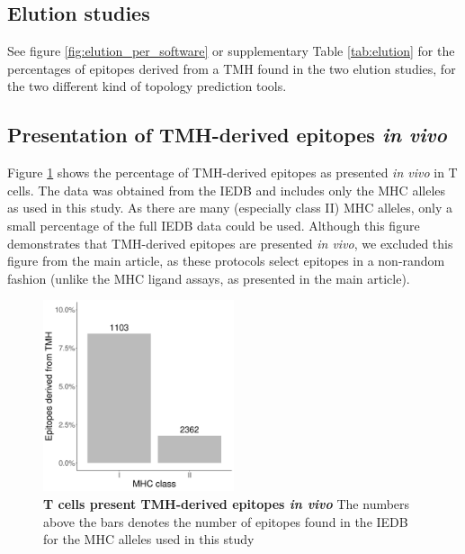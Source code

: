 \subsection{Elution studies}

See figure \ref{fig:elution_per_software} or
supplementary Table \ref{tab:elution} 
for the percentages of epitopes derived from a TMH 
found in the two elution studies, 
for the two different kind of topology prediction tools.



\clearpage

\subsection{Presentation of TMH-derived epitopes \emph{in vivo}}

Figure \ref{fig:elution_versus} shows the percentage of TMH-derived
epitopes as presented \emph{in vivo} in T cells. 
The data was obtained from the IEDB and includes only the MHC
alleles as used in this study. As there are many (especially class II)
MHC alleles, only a small percentage of the full IEDB data could be used.
Although this figure demonstrates that TMH-derived epitopes are presented
\emph{in vivo}, we excluded this figure from the main article, as these
protocols select epitopes in a non-random fashion (unlike the
MHC ligand assays, as presented in the main article).

\begin{figure}[!htbp]
  \centering
  \includegraphics[width=0.5\textwidth]{bbbq_article_issue_157/figure_2d.png}
  \caption{
    \textbf{
      T cells present TMH-derived epitopes \emph{in vivo}
    }
    The numbers above the bars denotes the number of epitopes
    found in the IEDB for the MHC alleles used in this study
  }
  \label{fig:elution_versus}
\end{figure}

